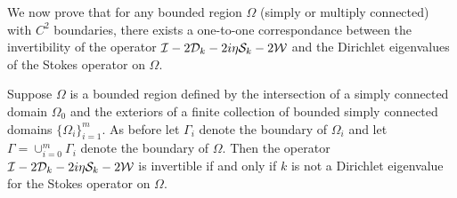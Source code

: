 We now prove that for any bounded region $\Omega$ (simply or multiply
connected) with $C^{2}$ boundaries, there exists a one-to-one correspondance
between the invertibility of the operator
$\mathcal I - 2{\mathcal D}_{k} - 2i\eta {\mathcal S}_{k} - 2{\mathcal W}$ and the Dirichlet eigenvalues
of the Stokes operator on $\Omega$. 

\begin{thrm}
Suppose $\Omega$ is a bounded region defined by the intersection of a 
simply connected domain $\Omega_{0}$ and the exteriors of a finite collection
of bounded simply connected domains $\{ \Omega_{i} \}_{i=1}^{m}$.
As before let $\Gamma_{i}$ denote the boundary of $\Omega_{i}$ and let
$\Gamma = \cup_{i=0}^{m} \Gamma_{i}$ denote the boundary of $\Omega$.
Then the operator $\mathcal I - 2{\mathcal D}_{k} - 2i\eta {\mathcal S}_{k} - 2{\mathcal W}$
is invertible if and only if $k$ is not a Dirichlet eigenvalue
for the Stokes operator on $\Omega$.
\end{thrm}


